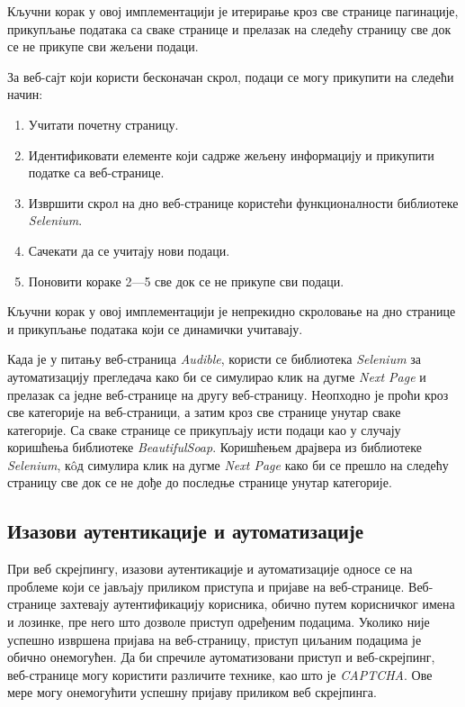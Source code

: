 \documentclass[12pt,oneside]{memoir}
\begin{document}
Кључни корак у овој имплементацији је итерирање кроз све странице пагинације, прикупљање података са сваке странице и прелазак на следећу страницу све док се не прикупе сви жељени подаци.

За веб-сајт који користи бесконачан скрол, подаци се могу прикупити на следећи начин:
\begin{enumerate}
  \item Учитати почетну страницу.
  \item Идентификовати елементе који садрже жељену информацију и прикупити податке са веб-странице.
  \item Извршити скрол на дно веб-странице користећи функционалности библиотеке \textit{Selenium}.
  \item Сачекати да се учитају нови подаци.
  \item Поновити кораке 2---5 све док се не прикупе сви подаци.
\end{enumerate}

Кључни корак у овој имплементацији је непрекидно скроловање на дно странице и прикупљање података који се динамички учитавају.

Када је у питању веб-страница \textit{Audible}, користи се библиотека \textit{Selenium} за аутоматизацију прегледача како би се симулирао клик на дугме \textit{Next Page} и прелазак са једне веб-странице на другу веб-страницу. Неопходно је проћи кроз све категорије на веб-страници, а затим кроз све странице унутар сваке категорије. Са сваке странице се прикупљају исти подаци као у случају коришћења библиотеке \textit{BeautifulSoap}. Коришћењем драјвера из библиотеке \textit{Selenium}, кôд симулира клик на дугме \textit{Next Page} како би се прешло на следећу страницу све док се не дође до последње странице унутар категорије. 

\subsection{Изазови аутентикације и аутоматизације}
\label{chp:login}
При веб скрејпингу, изазови аутентикације и аутоматизације односе се на проблеме који се јављају приликом приступа и пријаве на веб-странице. Веб-странице захтевају аутентификацију корисника, обично путем корисничког имена и лозинке, пре него што дозволе приступ одређеним подацима. Уколико није успешно извршена пријава на веб-страницу, приступ циљаним подацима је обично онемогућен. Да би спречиле аутоматизовани приступ и веб-скрејпинг, веб-странице могу користити различите технике, као што је \textit{CAPTCHA}. Ове мере могу онемогућити успешну пријаву приликом веб скрејпинга.
\end{document}
